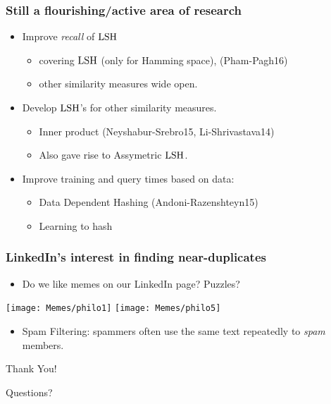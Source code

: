 \documentclass{beamer}
\begin{document}
\begin{frame}
\frametitle{Still a flourishing/active area of research}
\begin{itemize}
\item Improve \textit{recall} of $\mathrm{LSH}$ 
\begin{itemize}
\item covering $\mathrm{LSH}$ (only for Hamming space), (Pham-Pagh16)
\item other similarity measures wide open.
\end{itemize} 
\item Develop $\mathrm{LSH}$'s for other similarity measures.
\begin{itemize}
\item Inner product (Neyshabur-Srebro15, Li-Shrivastava14)
\item Also gave rise to Assymetric $\mathrm{LSH}$.
\end{itemize}
\item Improve training and query times based on data:
\begin{itemize}
\item Data Dependent Hashing (Andoni-Razenshteyn15)
\item Learning to hash
\end{itemize}
\end{itemize}
\end{frame}

\begin{frame}
\frametitle{LinkedIn's interest in finding near-duplicates}
\begin{itemize}
\item Do we like memes on our LinkedIn page? Puzzles?
\end{itemize}
\begin{center}
\texttt{[image: Memes/philo1]}
\texttt{[image: Memes/philo5]}
\end{center}
\begin{itemize}
\item Spam Filtering: spammers often use the same text repeatedly to \textit{spam} members.
\end{itemize}
\end{frame}

\begin{frame}
\begin{center}
Thank You!
\end{center}\pause
\begin{center}
Questions?
\end{center}
\end{frame}
\end{document}
